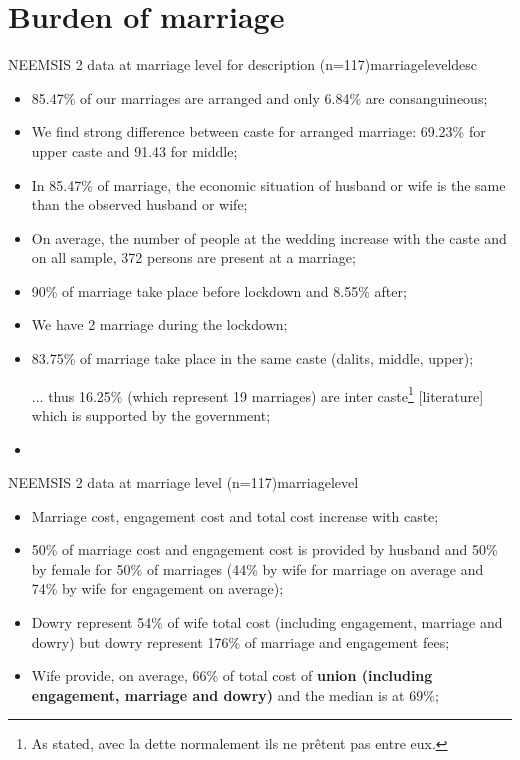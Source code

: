 \documentclass[a4paper, 11pt, onecolumn]{article}
\begin{document}
\section{Burden of marriage}

\begin{greybox}{NEEMSIS 2 data at marriage level for description (n=117)}{marriageleveldesc}
\begin{itemize}[leftmargin=*]
\item 85.47\% of our marriages are arranged and only 6.84\% are consanguineous;
\item We find strong difference between caste for arranged marriage: 69.23\% for upper caste and 91.43 for middle;
\item In 85.47\% of marriage, the economic situation of husband or wife is the same than the observed husband or wife;
\item On average, the number of people at the wedding increase with the caste and on all sample, 372 persons are present at a marriage;
\item 90\% of marriage take place before lockdown and 8.55\% after;
\item We have 2 marriage during the lockdown;
\item 83.75\% of marriage take place in the same caste (dalits, middle, upper);
\item [...] thus 16.25\% (which represent 19 marriages) are inter caste\footnote{As \cite{Guerin2014a} stated, avec la dette normalement ils ne prêtent pas entre eux.} [literature] which is supported by the government;
\item 
\end{itemize}
\end{greybox}


\begin{greybox}{NEEMSIS 2 data at marriage level (n=117)}{marriagelevel}
\begin{itemize}[leftmargin=*]
\item Marriage cost, engagement cost and total cost increase with caste;
\item 50\% of marriage cost and engagement cost is provided by husband and 50\% by female for 50\% of marriages (44\% by wife for marriage on average and 74\% by wife for engagement on average);
\item Dowry represent 54\% of wife total cost (including engagement, marriage and dowry) but dowry represent 176\% of marriage and engagement fees;
\item Wife provide, on average, 66\% of total cost of \textbf{union (including engagement, marriage and dowry)} and the median is at 69\%;
\end{itemize}
\end{greybox}
\end{document}
